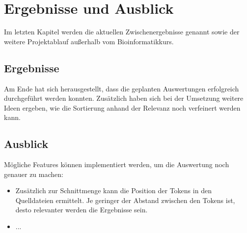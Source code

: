 \documentclass[a4paper,10pt]{article}
\begin{document}
\section{Ergebnisse und Ausblick}
    Im letzten Kapitel werden die aktuellen Zwischenergebnisse genannt sowie der weitere Projektablauf außerhalb vom Bioinformatikkurs.

    \subsection{Ergebnisse}
        Am Ende hat sich herausgestellt, dass die geplanten Auswertungen erfolgreich durchgeführt werden konnten. Zusätzlich haben sich bei der Umsetzung weitere Ideen ergeben, wie die Sortierung anhand der Relevanz noch verfeinert werden kann.

    \subsection{Ausblick}
        Mögliche Features können implementiert werden, um die Auswertung noch genauer zu machen:
        \begin{itemize}
            \item Zusätzlich zur Schnittmenge kann die Position der Tokens in den Quelldateien ermittelt. Je geringer der Abstand zwischen den Tokens ist, desto relevanter werden die Ergebnisse sein.
            \item ...
        \end{itemize}
\end{document}
